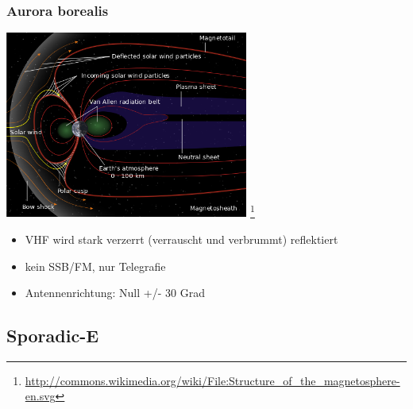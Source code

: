 \begin{frame}
    \frametitle{Aurora borealis}

    \begin{center}
        \includegraphics[width=0.6\textwidth,height=.5\textheight,keepaspectratio]{bv11/Structure_of_the_magnetosphere-en.png}
        \footnote{\tiny \url{http://commons.wikimedia.org/wiki/File:Structure_of_the_magnetosphere-en.svg}}
    \end{center}

    \begin{itemize}
        \item VHF wird stark verzerrt (verrauscht und verbrummt) reflektiert
        \item kein SSB/FM, nur Telegrafie
        \item Antennenrichtung: Null +/- 30 Grad
    \end{itemize}

\end{frame}

\subsection{Sporadic-E}

